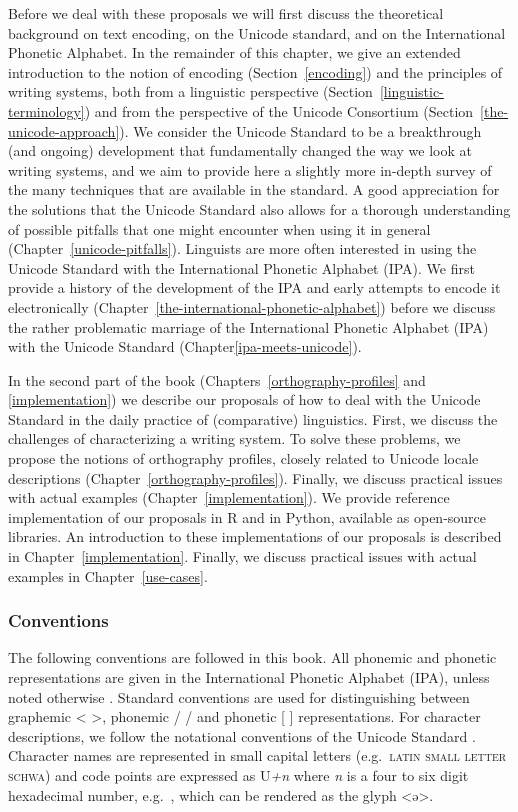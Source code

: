Before we deal with these proposals we will first discuss the theoretical
background on text encoding, on the Unicode standard, and on the International
Phonetic Alphabet. In the remainder of this chapter, we give an extended
introduction to the notion of encoding (Section~\ref{encoding}) and the
principles of writing systems, both from a linguistic perspective
(Section~\ref{linguistic-terminology}) and from the perspective of the Unicode
Consortium (Section~\ref{the-unicode-approach}). We consider the Unicode
Standard to be a breakthrough (and ongoing) development that fundamentally
changed the way we look at writing systems, and we aim to provide here a
slightly more in-depth survey of the many techniques that are available in the
standard. A good appreciation for the solutions that the Unicode Standard also
allows for a thorough understanding of possible pitfalls that one might
encounter when using it in general (Chapter~\ref{unicode-pitfalls}). Linguists are more often interested in using the Unicode Standard with the International Phonetic Alphabet (IPA). We first provide a history of the development of the IPA and early attempts to encode it electronically (Chapter~\ref{the-international-phonetic-alphabet}) before we discuss the rather problematic marriage of the International Phonetic Alphabet (IPA) with the Unicode Standard (Chapter\ref{ipa-meets-unicode}).

In the second part of the book (Chapters~\ref{orthography-profiles} and
\ref{implementation}) we describe our proposals of how to deal with the Unicode
Standard in the daily practice of (comparative) linguistics. First, we discuss the
challenges of characterizing a writing system. To solve these problems, we
propose the notions of orthography profiles, closely related to Unicode locale
descriptions (Chapter~\ref{orthography-profiles}). Finally, we discuss practical
issues with actual examples (Chapter~\ref{implementation}). We provide reference
implementation of our proposals in R and in Python, available as open-source
libraries. An introduction to these implementations of our proposals is
described in Chapter~\ref{implementation}. Finally, we discuss practical issues
with actual examples in Chapter~\ref{use-cases}. 

\subsubsection*{Conventions}

The following conventions are followed in this book. All phonemic and phonetic
representations are given in the International Phonetic Alphabet (IPA), unless
noted otherwise \citep{IPA2005}. Standard conventions are used for
distinguishing between graphemic < >, phonemic / / and phonetic [ ]
representations. For character descriptions, we follow the notational
conventions of the Unicode Standard \citep{Unicode2014}. Character names are
represented in small capital letters (e.g.~\textsc{latin small letter schwa})
and code points are expressed as U\emph{+n} where \emph{n} is a four to six
digit hexadecimal number, e.g.~, which can be rendered as the glyph <ə>.

